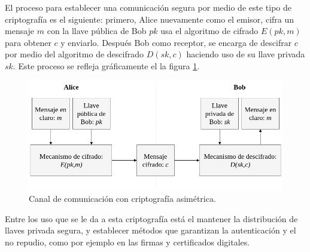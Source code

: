   El proceso para establecer una comunicación segura por medio de este tipo
  de criptografía es el siguiente: primero, Alice nuevamente como el emisor,
  cifra un mensaje $m$ con la llave pública de Bob $pk$ usa el algoritmo de
  cifrado $E(pk,m)$ para obtener $c$ y enviarlo. Después Bob como receptor,
  se encarga de descifrar $c$ por medio del algoritmo de descifrado
  $D(sk,c)$ haciendo uso de su llave privada $sk$. Este proceso se refleja
  gráficamente el la figura \ref{cripto_asimetrica}.

  \begin{figure}[H]
    \begin{center}
      \includegraphics[width=0.8\linewidth]
        {contenidos/antecedentes/intro/img/cripto_asimetrica.png}
      \caption{Canal de comunicación con criptografía asimétrica.}
      \label{cripto_asimetrica}
    \end{center}
  \end{figure}

  Entre los uso que se le da a esta criptografía está el mantener la
  distribución de llaves privada segura, y establecer métodos que garantizan
  la autenticación y el no repudio, como por ejemplo en las firmas y
  certificados digitales.
